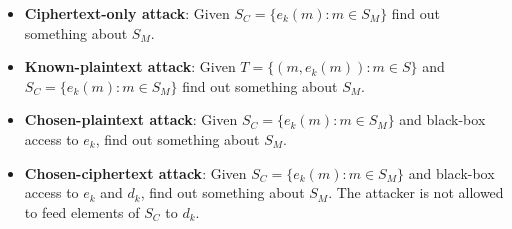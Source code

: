 \begin{itemize}
\item \textbf{Ciphertext-only attack}:
Given $S_C = \{e_k(m): m \in S_M\}$ find out something about $S_M$.

\item \textbf{Known-plaintext attack}:
Given $T = \{(m, e_k(m)): m \in S\}$ and $S_C = \{e_k(m): m \in S_M\}$ find out something about $S_M$.

\item \textbf{Chosen-plaintext attack}:
Given $S_C = \{e_k(m): m \in S_M\}$ and black-box access to $e_k$,
find out something about $S_M$.

\item \textbf{Chosen-ciphertext attack}:
Given $S_C = \{e_k(m): m \in S_M\}$ and black-box access to $e_k$ and $d_k$,
find out something about $S_M$. The attacker is not allowed to feed elements of $S_C$ to $d_k$.
\end{itemize}


